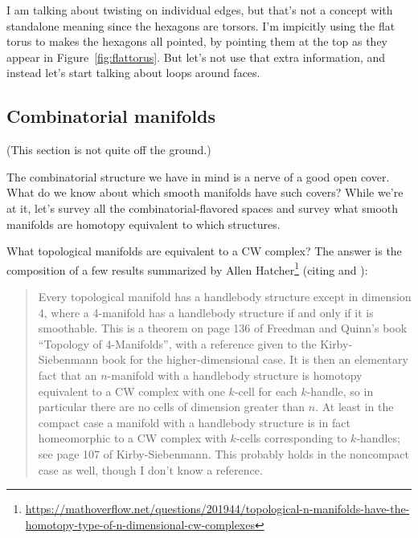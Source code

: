 I am talking about twisting on individual edges, but that's not a concept with standalone meaning since the hexagons are torsors. I'm impicitly using the flat torus to makes the hexagons all pointed, by pointing them at the top as they appear in Figure~\ref{fig:flattorus}. But let's not use that extra information, and instead let's start talking about loops around faces.


\subsection{Combinatorial manifolds}

(This section is not quite off the ground.)

The combinatorial structure we have in mind is a nerve of a good open cover. What do we know about which smooth manifolds have such covers? While we're at it, let's survey all the combinatorial-flavored spaces and survey what smooth manifolds are homotopy equivalent to which structures.

What topological manifolds are equivalent to a CW complex? The answer is the composition of a few results summarized by Allen Hatcher\footnote{\url{https://mathoverflow.net/questions/201944/topological-n-manifolds-have-the-homotopy-type-of-n-dimensional-cw-complexes}} (citing \cite{kirby_siebenmann} and \cite{freedman_quinn}):

\begin{quote}
Every topological manifold has a handlebody structure except in dimension 4, where a 4-manifold has a handlebody structure if and only if it is smoothable. This is a theorem on page 136 of Freedman and Quinn's book ``Topology of 4-Manifolds'', with a reference given to the Kirby-Siebenmann book for the higher-dimensional case. It is then an elementary fact that an \( n \)-manifold with a handlebody structure is homotopy equivalent to a CW complex with one \( k \)-cell for each \( k \)-handle, so in particular there are no cells of dimension greater than \( n \). At least in the compact case a manifold with a handlebody structure is in fact homeomorphic to a CW complex with \( k \)-cells corresponding to \( k \)-handles; see page 107 of Kirby-Siebenmann. This probably holds in the noncompact case as well, though I don't know a reference.
\end{quote}


